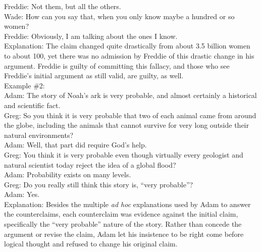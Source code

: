 \documentclass[a4paper,12pt,single,pdftex]{scrartcl}
\begin{document}
    
      Freddie: Not them, but all the others.
    \\

    
      Wade: How can you say that, when you only know maybe a hundred or so women?
    \\

    
      Freddie: Obviously, I am talking about the ones I know.
    \\

    
      Explanation: The claim changed quite drastically from about 3.5 billion women to about 100, yet there was no admission by Freddie of this drastic change in his argument.  Freddie is guilty of committing this fallacy, and those who see Freddie’s initial argument as still valid, are guilty, as well.
    \\

    
      Example \#2:
    \\

    
      Adam: The story of Noah’s ark is very probable, and almost certainly a historical and scientific fact.
    \\

    
      Greg: So you think it is very probable that two of each animal came from around the globe, including the animals that cannot survive for very long outside their natural environments?
    \\

    
      Adam: Well, that part did require God’s help.
    \\

    
      Greg: You think it is very probable even though virtually every geologist and natural scientist today reject the idea of a global flood?
    \\

    
      Adam: Probability exists on many levels.
    \\

    
      Greg: Do you really still think this story is, “very probable”?
    \\

    
      Adam: Yes.
    \\

    
      Explanation: Besides the multiple {\it ad hoc}  explanations used by Adam to answer the counterclaims, each counterclaim was evidence against the initial claim, specifically the “very probable” nature of the story.  Rather than concede the argument or revise the claim, Adam let his insistence to be right come before logical thought and refused to change his original claim.
    \\
\end{document}
